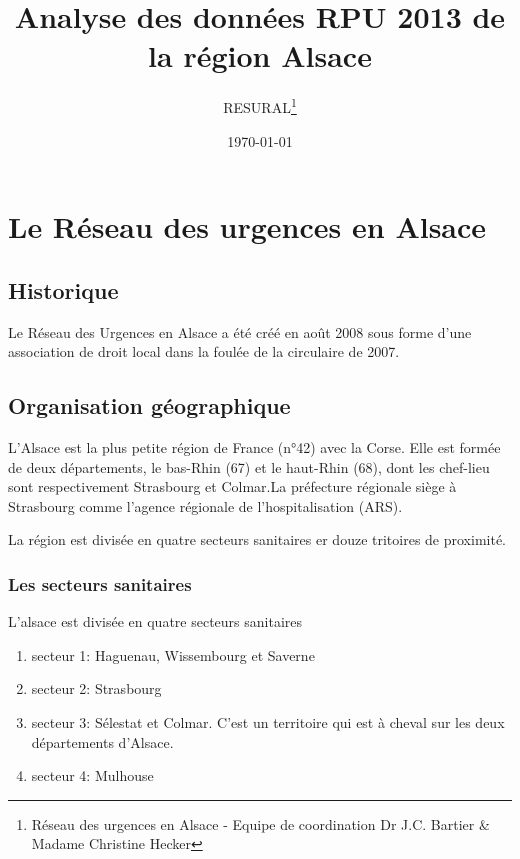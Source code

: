 \documentclass[12pt,english,french,twoside]{report}\usepackage[]{graphicx}\usepackage[]{color}
\begin{document}
\title{Analyse des données RPU 2013 de la région Alsace}
\author{RESURAL\thanks{Réseau des urgences en Alsace - Equipe de coordination Dr J.C.
Bartier \& Madame Christine Hecker}}
\date{\today}
\maketitle


\tableofcontents
\listoftables
\listoffigures



\part{Le Réseau des urgences en Alsace}

\chapter{Historique}


Le Réseau des Urgences en Alsace a été créé en août 2008 sous forme d'une association de droit local dans la foulée de la circulaire de 2007.



\chapter{Organisation géographique}


L'Alsace est la plus petite région de France (n°42) avec la Corse. Elle est formée de deux départements, le bas-Rhin (67) et le haut-Rhin (68), dont les chef-lieu sont respectivement Strasbourg et Colmar.La préfecture régionale siège à Strasbourg comme l'agence régionale de l'hospitalisation  (ARS).

La région est divisée en quatre secteurs sanitaires er douze tritoires de proximité.

\section{Les secteurs sanitaires}

L'alsace est divisée en quatre secteurs sanitaires
\begin{enumerate}
  \item secteur 1: Haguenau, Wissembourg et Saverne
  \item secteur 2: Strasbourg
  \item secteur 3: Sélestat et Colmar. C'est un territoire qui est à cheval sur les deux départements d'Alsace.
  \item secteur 4: Mulhouse
\end{enumerate}
\end{document}
